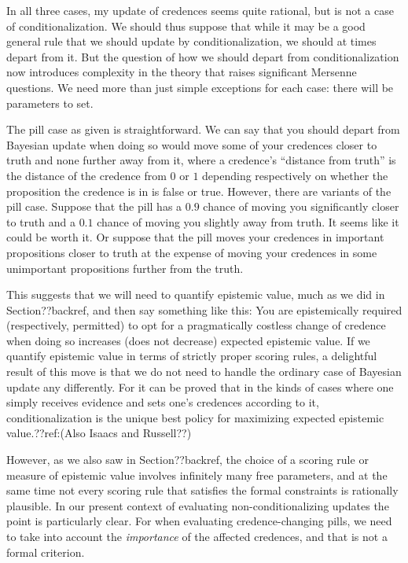 In all three cases, my update of credences seems quite rational, but is not a case of conditionalization. We should thus
suppose that while it may be a good general rule that we should update by conditionalization, we should at times depart from it.
But the question of how we should depart from conditionalization now introduces complexity in the theory that raises significant
Mersenne questions. We need more than just simple exceptions for each case: there will be parameters to set.

The pill case as given is straightforward. We can say that you should depart from Bayesian update when doing so would move
some of your credences closer to truth and none further away from it, where a credence's ``distance from truth'' is the 
distance of the credence from $0$ or $1$ depending respectively on whether the proposition the credence is in is false or
true. However, there are variants of the pill case. Suppose that the pill has a $0.9$ chance of moving you significantly
closer to truth and a $0.1$ chance of moving you slightly away from truth. It seems like it could be worth it. Or suppose
that the pill moves your credences in important propositions closer to truth at the expense of moving your credences in some
unimportant propositions further from the truth.

This suggests that we will need to quantify epistemic value, much as we did in Section??backref, and then say
something like this: You are epistemically required (respectively, permitted) to opt for a pragmatically costless change of 
credence when doing so increases (does not decrease) expected epistemic value. If we quantify epistemic value in terms of
strictly proper scoring rules, a delightful result of this move is that we do not need to handle the ordinary case of 
Bayesian update any differently. For it can be proved that in the kinds of cases where one simply receives
evidence and sets one's credences according to it, conditionalization is the unique best policy for maximizing expected
epistemic value.??ref:(Also Isaacs and Russell??) 

However, as we also saw in Section??backref, the choice of a scoring rule or measure of epistemic value involves infinitely
many free parameters, and at the same time not every scoring rule that satisfies the formal constraints is rationally
plausible. In our present context of evaluating non-conditionalizing updates the point is particularly clear. For when
evaluating credence-changing pills, we need to take into account the \textit{importance} of the affected credences, and
that is not a formal criterion. 

